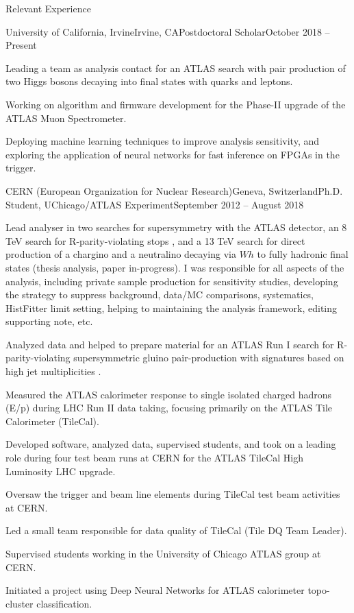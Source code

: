 \documentclass{resume}
\begin{document}

\begin{rsection}{Relevant Experience}

  \begin{rsubsection}{University of California, Irvine}{Irvine, CA}{Postdoctoral Scholar}{October 2018 -- Present}
  \item Leading a team as analysis contact for an ATLAS search with pair production of two Higgs bosons decaying into final states with quarks and leptons.
  \item Working on algorithm and firmware development for the Phase-II upgrade of the ATLAS Muon Spectrometer.
  \item Deploying machine learning techniques to improve analysis sensitivity, and exploring the application of neural networks for fast inference on FPGAs in the trigger. 
  \end{rsubsection}

  \begin{rsubsection}{CERN (European Organization for Nuclear Research)}{Geneva, Switzerland}{Ph.D. Student, UChicago/ATLAS Experiment}{September 2012 -- August 2018}
  \item Lead analyser in two searches for supersymmetry with the ATLAS detector, an 8 TeV search for R-parity-violating stops \cite{RPVstop2016}, and a 13 TeV search for direct production of a chargino and a neutralino decaying via $Wh$ to fully hadronic final states (thesis analysis, paper in-progress). I was responsible for all aspects of the analysis, including private sample production for sensitivity studies, developing the strategy to suppress background, data/MC comparisons, systematics, HistFitter limit setting, helping to maintaining the analysis framework, editing supporting note, etc.
  \item Analyzed data and helped to prepare material for an ATLAS Run I search for R-parity-violating supersymmetric gluino pair-production with signatures based on high jet multiplicities \cite{Multijet2015}. 
  \item Measured the ATLAS calorimeter response to single isolated charged hadrons (E/p) during LHC Run II data taking, focusing primarily on the ATLAS Tile Calorimeter (TileCal).
  \item Developed software, analyzed data, supervised students, and took on a leading role during four test beam runs at CERN for the ATLAS TileCal High Luminosity LHC upgrade.
  \item Oversaw the trigger and beam line elements during TileCal test beam activities at CERN. 
  \item Led a small team responsible for data quality of TileCal (Tile DQ Team Leader).
  \item Supervised students working in the University of Chicago ATLAS group at CERN.
  \item Initiated a project using Deep Neural Networks for ATLAS calorimeter topo-cluster classification.
  \end{rsubsection}


\end{rsection}
\end{document}
